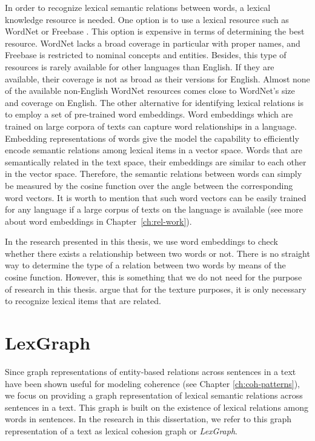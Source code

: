 In order to recognize lexical semantic relations between words, a lexical knowledge resource is needed.   
One option is to use a lexical resource such as WordNet \cite{fellbaum98} or Freebase \cite{bollacker08}.  
This option is expensive in terms of determining the best resource.  
WordNet lacks a broad coverage in particular with proper names, and Freebase is restricted to nominal concepts and entities. 
Besides, this type of resources is rarely available for other languages than English.
If they are available, their coverage is not as broad as their versions for English. 
Almost none of the available non-English WordNet resources comes close to WordNet's size and coverage on English. 
The other alternative for identifying lexical relations is to employ a set of pre-trained word embeddings. 
Word embeddings which are trained on large corpora of texts can capture word relationships in a language. 
Embedding representations of words give the model the capability to efficiently encode semantic relations among lexical items in a vector space. 
Words that are semantically related in the text space, their embeddings are similar to each other in the vector space. 
Therefore, the semantic relations between words can simply be measured by the cosine function over the angle between the corresponding word vectors. 
It is worth to mention that such word vectors can be easily trained for any language if a large corpus of texts on the language is available (see more about word embeddings in Chapter~\ref{ch:rel-work}).  

In the research presented in this thesis, we use word embeddings to check whether there exists a relationship between two words or not.  
There is no straight way to determine the type of a relation between two words by means of the cosine function. 
However, this is something that we do not need for the purpose of research in this thesis. 
 argue that for the texture purposes, it is only necessary to recognize lexical items that are related. 

\section{LexGraph}
\label{sec:lex-graph-representation}

Since graph representations of entity-based relations across sentences in a text have been shown useful for modeling coherence (see Chapter \ref{ch:coh-patterns}), we focus on providing a graph representation of lexical semantic relations across sentences in a text. 
This graph is built on the existence of lexical relations among words in sentences. 
In the research in this dissertation, we refer to this graph representation of a text as lexical cohesion graph or \emph{LexGraph}. 

